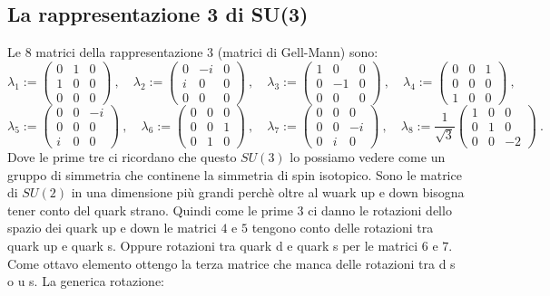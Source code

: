 \subsection{La rappresentazione 3 di SU(3)}
Le $8$ matrici della rappresentazione $3$ (matrici di Gell-Mann) sono:
\begin{equation*}
    {\displaystyle \lambda _{1}:={\begin{pmatrix}0&1&0\\1&0&0\\0&0&0\end{pmatrix}}~,\quad \lambda _{2}:={\begin{pmatrix}0&-i&0\\i&0&0\\0&0&0\end{pmatrix}}~,\quad \lambda _{3}:={\begin{pmatrix}1&0&0\\0&-1&0\\0&0&0\end{pmatrix}}~,\quad \lambda _{4}:={\begin{pmatrix}0&0&1\\0&0&0\\1&0&0\end{pmatrix}}~,}
\end{equation*}
\begin{equation*}
    {\displaystyle \lambda _{5}:={\begin{pmatrix}0&0&-i\\0&0&0\\i&0&0\end{pmatrix}}~,\quad \lambda _{6}:={\begin{pmatrix}0&0&0\\0&0&1\\0&1&0\end{pmatrix}}~,\quad \lambda _{7}:={\begin{pmatrix}0&0&0\\0&0&-i\\0&i&0\end{pmatrix}}~,\quad \lambda _{8}:={\frac {1}{\sqrt {3}}}{\begin{pmatrix}1&0&0\\0&1&0\\0&0&-2\end{pmatrix}}~.}
\end{equation*}
Dove le prime tre ci ricordano che questo $SU(3)$ lo possiamo vedere come un gruppo di simmetria che continene la simmetria di spin isotopico. Sono le matrice di $SU(2)$ in una dimensione più grandi perchè oltre al wuark up e down bisogna tener conto del quark strano. Quindi come le prime $3$ ci danno le rotazioni dello spazio dei quark up e down le matrici $4$ e $5$ tengono conto delle rotazioni tra quark up e quark s. Oppure rotazioni tra quark d e quark s per le matrici $6$ e $7$. Come ottavo elemento ottengo la terza matrice che manca delle rotazioni tra d s o u s. La generica rotazione:
